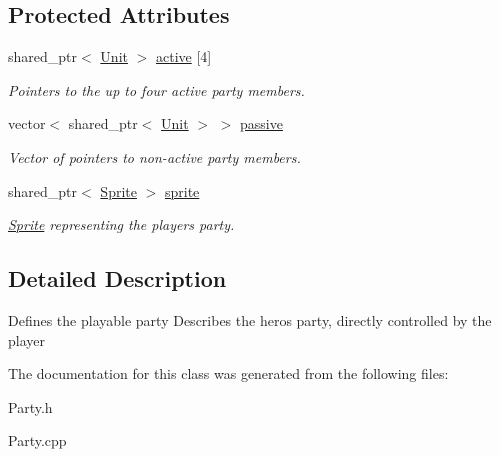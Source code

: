 \subsection*{Protected Attributes}
\begin{DoxyCompactItemize}
\item 
shared\+\_\+ptr$<$ \hyperlink{class_unit}{Unit} $>$ \hyperlink{class_party_a6f3bc72c1b9fec43f3e82b60bb92e554}{active} \mbox{[}4\mbox{]}\hypertarget{class_party_a6f3bc72c1b9fec43f3e82b60bb92e554}{}\label{class_party_a6f3bc72c1b9fec43f3e82b60bb92e554}

\begin{DoxyCompactList}\small\item\em Pointers to the up to four active party members. \end{DoxyCompactList}\item 
vector$<$ shared\+\_\+ptr$<$ \hyperlink{class_unit}{Unit} $>$ $>$ \hyperlink{class_party_a81db9eaa6be90ce9a8bc62b4d13f5956}{passive}\hypertarget{class_party_a81db9eaa6be90ce9a8bc62b4d13f5956}{}\label{class_party_a81db9eaa6be90ce9a8bc62b4d13f5956}

\begin{DoxyCompactList}\small\item\em Vector of pointers to non-\/active party members. \end{DoxyCompactList}\item 
shared\+\_\+ptr$<$ \hyperlink{class_sprite}{Sprite} $>$ \hyperlink{class_party_ae063baa6bfa6fe247ade34a135eb3552}{sprite}\hypertarget{class_party_ae063baa6bfa6fe247ade34a135eb3552}{}\label{class_party_ae063baa6bfa6fe247ade34a135eb3552}

\begin{DoxyCompactList}\small\item\em \hyperlink{class_sprite}{Sprite} representing the player\textquotesingle{}s party. \end{DoxyCompactList}\end{DoxyCompactItemize}


\subsection{Detailed Description}
Defines the playable party Describes the hero\textquotesingle{}s party, directly controlled by the player 

The documentation for this class was generated from the following files\+:\begin{DoxyCompactItemize}
\item 
Party.\+h\item 
Party.\+cpp\end{DoxyCompactItemize}
